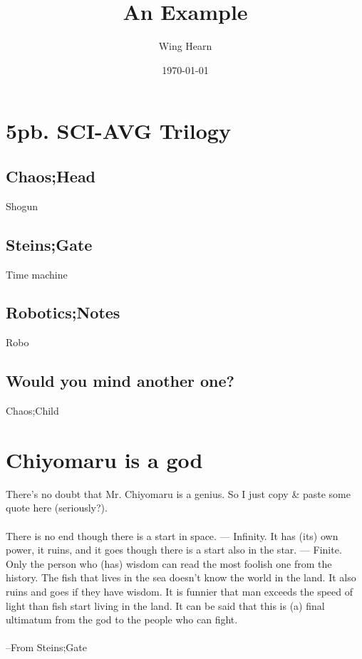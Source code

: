 \documentclass[12pt, a4paper]{article}
\title{An Example}
\author{Wing Hearn}
\date{\today}
\begin{document}
\maketitle
\newpage
\tableofcontents
\newpage
\section{5pb. SCI-AVG Trilogy}
\subsection{Chaos;Head}
Shogun
\subsection{Steins;Gate}
Time machine
\subsection{Robotics;Notes}
Robo
\subsection{Would you mind another one?}
Chaos;Child
\section{Chiyomaru is a god}
There's no doubt that Mr. Chiyomaru is a genius.
So I just copy \& paste some quote here (seriously?).\\\\
There is no end though there is a start in space. — Infinity.
It has (its) own power, it ruins, and it goes though there is a start also in the star. — Finite.
Only the person who (has) wisdom can read the most foolish one from the history.
The fish that lives in the sea doesn't know the world in the land. It also ruins and goes if they have wisdom.
It is funnier that man exceeds the speed of light than fish start living in the land.
It can be said that this is (a) final ultimatum from the god to the people who can fight.\\\\
--From Steins;Gate
\end{document}
